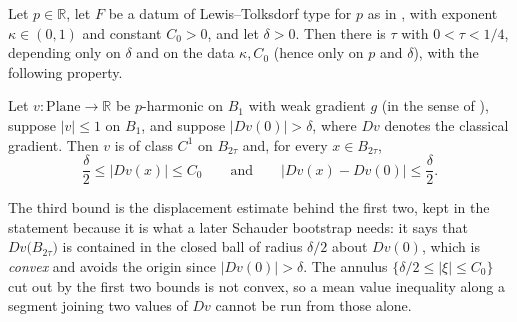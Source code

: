 \begin{lemma}
Let $p\in\mathbb{R}$, let $F$ be a datum of Lewis--Tolksdorf type for $p$ as in
, with exponent $\kappa\in(0,1)$ and constant $C_0>0$, and
let $\delta>0$.  Then there is $\tau$ with $0<\tau<1/4$, depending only on $\delta$ and on the
data $\kappa,C_0$ (hence only on $p$ and $\delta$), with the following property.

Let $v\colon\mathrm{Plane}\to\mathbb{R}$ be $p$-harmonic on $B_1$ with weak gradient $g$ (in
the sense of ), suppose $\lvert v\rvert\le1$ on $B_1$, and suppose
$\lvert Dv(0)\rvert>\delta$, where $Dv$ denotes the classical gradient.  Then $v$ is of class
$C^{1}$ on $B_{2\tau}$ and, for every $x\in B_{2\tau}$,
\[
  \frac{\delta}{2}\le\lvert Dv(x)\rvert\le C_0
  \qquad\text{and}\qquad
  \lvert Dv(x)-Dv(0)\rvert\le\frac{\delta}{2}.
\]

The third bound is the displacement estimate behind the first two, kept in the statement
because it is what a later Schauder bootstrap needs: it says that $Dv\bigl(B_{2\tau}\bigr)$ is
contained in the closed ball of radius $\delta/2$ about $Dv(0)$, which is \emph{convex} and
avoids the origin since $\lvert Dv(0)\rvert>\delta$.  The annulus
$\{\delta/2\le\lvert\xi\rvert\le C_0\}$ cut out by the first two bounds is not convex, so a
mean value inequality along a segment joining two values of $Dv$ cannot be run from those
alone.
\end{lemma}
